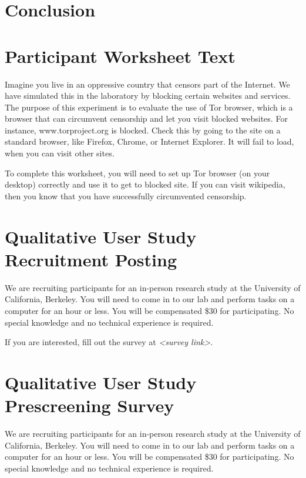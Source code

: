 \documentclass{template}
\begin{document}

\section{Conclusion} 


 

\appendix
\section{Participant Worksheet Text} 
\label{participant-worksheet}
Imagine you live in an oppressive country that censors part of the Internet. We have simulated this in the laboratory by blocking certain websites and services. The purpose of this experiment is to evaluate the use of Tor browser, which is a browser that can circumvent censorship and let you visit blocked websites. For instance, www.torproject.org is blocked. Check this by going to the site on a standard browser, like Firefox, Chrome, or Internet Explorer. It will fail to load, when you can visit other sites.

To complete this worksheet, you will need to set up Tor browser (on your desktop) correctly and use it to get to blocked site. If you can visit wikipedia, then you know that you have successfully circumvented censorship.

\section{Qualitative User Study Recruitment Posting} 
We are recruiting participants for an in-person research study at the University of California, Berkeley. You will need to come in to our lab and perform tasks on a computer for an hour or less. You will be compensated \$30 for participating. 
No special knowledge and no technical experience is required. 

If you are interested, fill out the survey at \textit{<survey link>}. 

\section{Qualitative User Study Prescreening Survey} 
\label{qualitative-prescreening}
We are recruiting participants for an in-person research study at the University of California, Berkeley. You will need to come in to our lab and perform tasks on a computer for an hour or less. You will be compensated \$30 for participating. No special knowledge and no technical experience is required.
\end{document}
